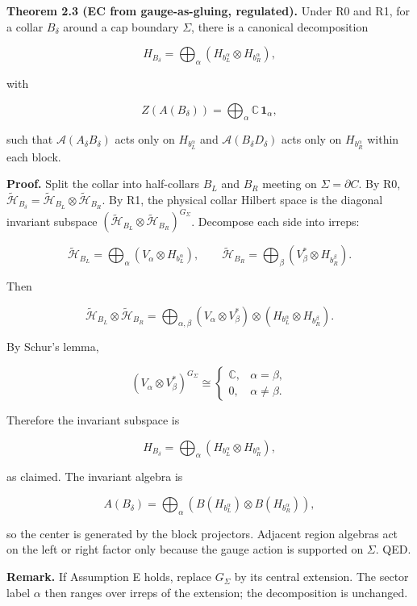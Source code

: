 \documentclass[11pt,a4paper]{article}
\theoremstyle{remark}
\begin{document}
\textbf{Theorem 2.3 (EC from gauge-as-gluing, regulated).} Under R0 and R1, for a
collar \(B_\delta\) around a cap boundary \(\Sigma\), there is a canonical
decomposition

\[
H_{B_\delta} = \bigoplus_{\alpha}
(H_{b_L^{\alpha}} \otimes H_{b_R^{\alpha}}),
\]

with

\[
Z(A(B_\delta)) = \bigoplus_\alpha \mathbb C\,\mathbf 1_\alpha,
\]

such that \(\mathcal{A}(A_\delta B_\delta)\) acts only on \(H_{b_L^\alpha}\) and
\(\mathcal{A}(B_\delta D_\delta)\) acts only on \(H_{b_R^\alpha}\) within each block.

\textbf{Proof.} Split the collar into half-collars \(B_L\) and \(B_R\) meeting on
\(\Sigma = \partial C\). By R0, \(\tilde{\mathcal H}_{B_\delta} =
\tilde{\mathcal H}_{B_L} \otimes \tilde{\mathcal H}_{B_R}\). By R1,
the physical collar Hilbert space is the diagonal invariant subspace
\((\tilde{\mathcal H}_{B_L} \otimes \tilde{\mathcal H}_{B_R})^{G_\Sigma}\).
Decompose each side into irreps:

\[
\tilde{\mathcal H}_{B_L} = \bigoplus_\alpha (V_\alpha \otimes H_{b_L^\alpha}),\qquad
\tilde{\mathcal H}_{B_R} = \bigoplus_\beta (V_\beta^* \otimes H_{b_R^\beta}).
\]

Then

\[
\tilde{\mathcal H}_{B_L} \otimes \tilde{\mathcal H}_{B_R}
= \bigoplus_{\alpha,\beta}
(V_\alpha \otimes V_\beta^*) \otimes
(H_{b_L^\alpha} \otimes H_{b_R^\beta}).
\]

By Schur's lemma,

\[
(V_\alpha \otimes V_\beta^*)^{G_\Sigma}
\cong
\begin{cases}
\mathbb C, & \alpha=\beta,\\
0, & \alpha\ne\beta.
\end{cases}
\]

Therefore the invariant subspace is

\[
H_{B_\delta} = \bigoplus_\alpha (H_{b_L^\alpha} \otimes H_{b_R^\alpha}),
\]

as claimed. The invariant algebra is

\[
A(B_\delta) = \bigoplus_\alpha
(B(H_{b_L^\alpha}) \otimes B(H_{b_R^\alpha})),
\]

so the center is generated by the block projectors. Adjacent region algebras
act on the left or right factor only because the gauge action is supported
on \(\Sigma\). QED.

\textbf{Remark.} If Assumption E holds, replace \(G_\Sigma\) by its central extension.
The sector label \(\alpha\) then ranges over irreps of the extension; the
decomposition is unchanged.
\end{document}
